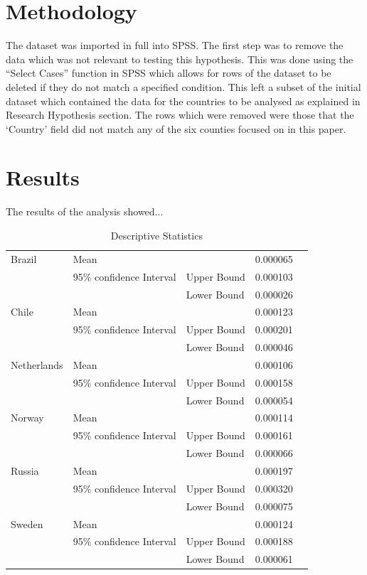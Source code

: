 \documentclass[conference]{IEEEtran}
\begin{document}
\section{Methodology}
The dataset was imported in full into SPSS. The first step was to remove the data which was not relevant to testing this hypothesis.
This was done using the ``Select Cases'' function in SPSS which allows for rows of the dataset to be deleted if they do not match a specified condition.
This left a subset of the initial dataset which contained the data for the countries to be analysed as explained in Research Hypothesis section.
The rows which were removed were those that the `Country' field did not match any of the six counties focused on in this paper.

\section{Results}
The results of the analysis showed...
\newline

\begin{table}[ht]
    \centering
    \caption{Descriptive Statistics}
    \begin{tabular}{| l | l | lll |}
    \hline
     Brazil&  Mean&  &  0.000065&   \\
     &  95\% confidence Interval&  Upper Bound&  0.000103&   \\
     &  &  Lower Bound&  0.000026&   \\
     Chile&  Mean&  &  0.000123&   \\
     &  95\% confidence Interval&  Upper Bound&  0.000201&   \\
     &  &  Lower Bound&  0.000046&   \\
     Netherlands&  Mean&  &  0.000106&   \\
     &  95\% confidence Interval&  Upper Bound& 0.000158&   \\
     &  &  Lower Bound&  0.000054&   \\
     Norway&  Mean&  &  0.000114&   \\
     &  95\% confidence Interval&  Upper Bound&  0.000161&   \\
     &  &  Lower Bound&  0.000066&   \\
     Russia&  Mean&  &  0.000197&   \\
     &  95\% confidence Interval&  Upper Bound&  0.000320&   \\
     &  &  Lower Bound&  0.000075&   \\
     Sweden&  Mean&  &  0.000124&   \\
     &  95\% confidence Interval&  Upper Bound&  0.000188&   \\
     &  &  Lower Bound&  0.000061& \\\hline
    \end{tabular}
    \end{table}
\end{document}
